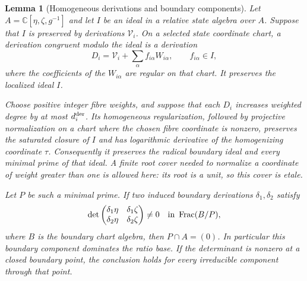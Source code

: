 \documentclass[11pt,a4paper]{article}
\numberwithin{equation}{section}
\theoremstyle{plain}
\newtheorem{lemma}[theorem]{Lemma}
\theoremstyle{definition}
\theoremstyle{remark}
\begin{document}
\begin{lemma}[Homogeneous derivations and boundary components]
\label{r3logic:boundaryfields}
Let $A=\mathbb C[\eta ,\zeta ,g^{-1}]$ and let $I$ be an ideal in a
relative state algebra over $A$. Suppose that $I$ is preserved by
derivations $\mathcal V_i $. On a selected state coordinate chart, a
\emph{derivation congruent modulo the ideal} is a derivation
\[
 D_i=\mathcal V_i +\sum_\alpha f_{i\alpha}W_{i\alpha},\qquad
 f_{i\alpha}\in I,
\]
where the coefficients of the $W_{i\alpha}$ are regular on that chart.
It preserves the localized ideal $I$.

Choose positive integer fibre weights, and suppose that each $D_i$
increases weighted degree by at most $d_i^{\rm der}$. Its homogeneous
regularization, followed by projective normalization on a chart where
the chosen fibre coordinate is nonzero, preserves the saturated
closure of $I$ and has logarithmic derivative of the homogenizing
coordinate $\tau$. Consequently it preserves the radical boundary
ideal and every minimal prime of that ideal. A finite root cover
needed to normalize a coordinate of weight greater than one is
allowed here: its root is a unit, so this cover is etale.

Let $P$ be such a minimal prime. If two induced boundary derivations
$\delta_1,\delta_2$ satisfy
\[
 \det\begin{pmatrix}
 \delta_1\eta &\delta_1\zeta \\
 \delta_2\eta &\delta_2\zeta 
 \end{pmatrix}\ne0
 \quad\hbox{in }\operatorname{Frac}(B/P),
\]
where $B$ is the boundary chart algebra, then $P\cap A=(0)$.
In particular this boundary component dominates the ratio base.
If the determinant is nonzero at a closed boundary point, the
conclusion holds for every irreducible component through that point.
\end{lemma}
\end{document}
